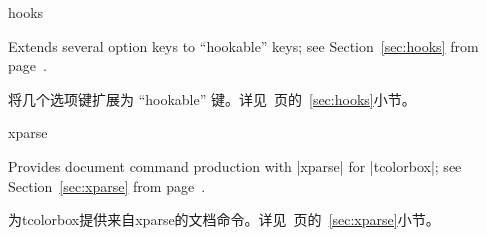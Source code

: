 \begin{docTcbKey}[library]{hooks}{}{}

Extends several option keys to \enquote{hookable} keys;
see Section~\ref{sec:hooks} from page~\pageref{sec:hooks}.

将几个选项键扩展为 \enquote{hookable} 键。详见~\pageref{sec:hooks}页的~\ref{sec:hooks}小节。

\end{docTcbKey}






\begin{docTcbKey}[library]{xparse}{}{}

Provides document command production with |xparse| for |tcolorbox|;
see Section~\ref{sec:xparse} from page~\pageref{sec:xparse}.

为tcolorbox提供来自xparse的文档命令。详见~\pageref{sec:xparse}页的~\ref{sec:xparse}小节。

\end{docTcbKey}










